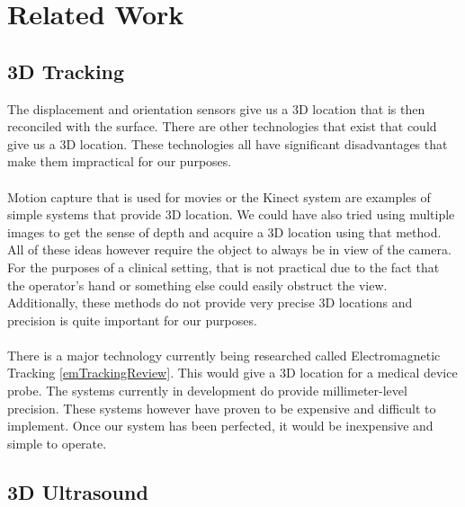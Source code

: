 \section{Related Work}

\subsection{3D Tracking}

The displacement and orientation sensors give us a 3D location that is then reconciled with the surface. There are other technologies that exist that could give us a 3D location. These technologies all have significant disadvantages that make them impractical for our purposes. \\
\\
Motion capture that is used for movies or the Kinect system are examples of simple systems that provide 3D location. We could have also tried using multiple images to get the sense of depth and acquire a 3D location using that method. All of these ideas however require the object to always be in view of the camera. For the purposes of a clinical setting, that is not practical due to the fact that the operator's hand or something else could easily obstruct the view. Additionally, these methods do not provide very precise 3D locations and precision is quite important for our purposes. \\
\\
There is a major technology currently being researched called Electromagnetic Tracking \ref{emTrackingReview}. This would give a 3D location for a medical device probe. The systems currently in development do provide millimeter-level precision. These systems however have proven to be expensive and difficult to implement. Once our system has been perfected, it would be inexpensive and simple to operate.

\subsection{3D Ultrasound}

